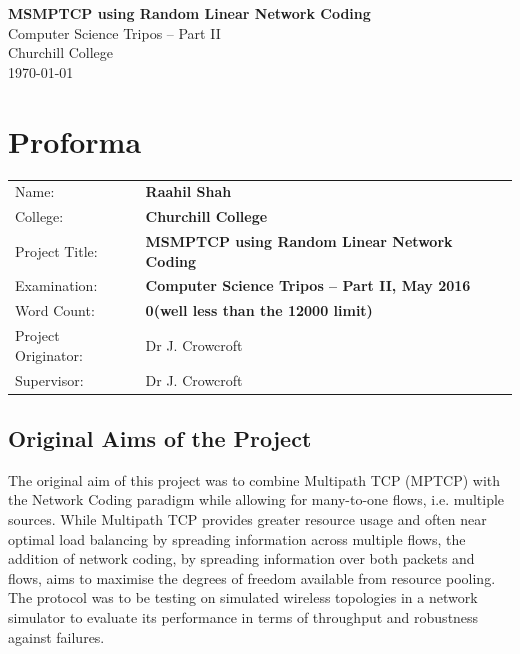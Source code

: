 \documentclass[12pt,a4paper,twoside,openright]{report}
\begin{document}





\pagestyle{empty}


\vspace*{60mm}
\begin{center}
\Huge
\textbf{MSMPTCP using Random Linear Network Coding} \\[5mm]
Computer Science Tripos -- Part II \\[5mm]
Churchill College \\[5mm]
\today  %
\end{center}


\pagestyle{plain}

\chapter*{Proforma}

{\large
\begin{tabular}{ll}
Name:               & \bf Raahil Shah                       \\
College:            & \bf Churchill College                     \\
Project Title:      & \bf MSMPTCP using Random Linear Network Coding \\
Examination:        & \bf Computer Science Tripos -- Part II, May 2016  \\
Word Count:         & \bf 0\footnotemark[1]
                      (well less than the 12000 limit)  \\
Project Originator: & Dr J. Crowcroft                    \\
Supervisor:         & Dr J. Crowcroft                    \\ 
\end{tabular}
}


\section*{Original Aims of the Project}

The original aim of this project was to combine Multipath TCP (MPTCP) with the Network Coding paradigm while allowing for many-to-one flows, i.e. multiple sources. While Multipath TCP provides greater resource usage and often near optimal load balancing by spreading information across multiple flows, the addition of network coding, by spreading information over both packets and flows, aims to maximise the degrees of freedom available from resource pooling. The protocol was to be testing on simulated wireless topologies in a network simulator to evaluate its performance in terms of throughput and robustness against failures. 
\end{document}
